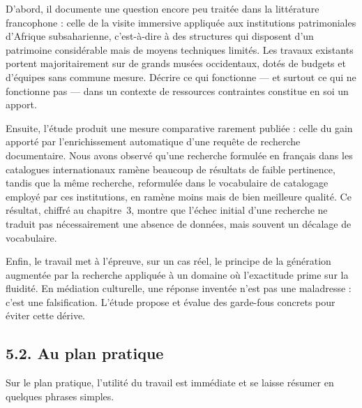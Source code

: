 D'abord, il documente une question encore peu traitée dans la littérature
francophone : celle de la visite immersive appliquée aux institutions
patrimoniales d'Afrique subsaharienne, c'est-à-dire à des structures qui
disposent d'un patrimoine considérable mais de moyens techniques limités. Les
travaux existants portent majoritairement sur de grands musées occidentaux,
dotés de budgets et d'équipes sans commune mesure. Décrire ce qui fonctionne —
et surtout ce qui ne fonctionne pas — dans un contexte de ressources contraintes
constitue en soi un apport.

Ensuite, l'étude produit une mesure comparative rarement publiée : celle du gain
apporté par l'enrichissement automatique d'une requête de recherche
documentaire. Nous avons observé qu'une recherche formulée en français dans les
catalogues internationaux ramène beaucoup de résultats de faible pertinence,
tandis que la même recherche, reformulée dans le vocabulaire de catalogage
employé par ces institutions, en ramène moins mais de bien meilleure qualité.
Ce résultat, chiffré au chapitre~3, montre que l'échec initial d'une recherche
ne traduit pas nécessairement une absence de données, mais souvent un décalage
de vocabulaire.

Enfin, le travail met à l'épreuve, sur un cas réel, le principe de la génération
augmentée par la recherche appliquée à un domaine où l'exactitude prime sur la
fluidité. En médiation culturelle, une réponse inventée n'est pas une
maladresse : c'est une falsification. L'étude propose et évalue des garde-fous
concrets pour éviter cette dérive.

\subsection*{5.2. Au plan pratique}

Sur le plan pratique, l'utilité du travail est immédiate et se laisse résumer en
quelques phrases simples.

